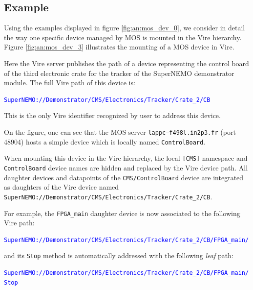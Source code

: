 \subsection{Example}

Using  the examples  displayed  in  figure \ref{fig:an:mos_dev_0},  we
consider  in detail  the way  one specific  device managed  by MOS  is
mounted   in  the   Vire   hierarchy.  Figure   \ref{fig:an:mos_dev_3}
illustrates the mounting of a MOS device in Vire.

Here the Vire  server publishes the path of a  device representing the
control board  of the third  electronic crate  for the tracker  of the
SuperNEMO demonstrator module.  The full Vire path of this device is:

\textcolor{blue}{\texttt{SuperNEMO://Demonstrator/CMS/Electronics/Tracker/Crate\_2/CB}}

This is  the only Vire identifier  recognized by user to  address this
device.

On    the   figure,    one    can   see    that    the   MOS    server
\texttt{lappc−f498l.in2p3.fr} (port 48904) hosts a simple device which
is locally named \texttt{ControlBoard}.

When  mounting   this  device  in   the  Vire  hierarchy,   the  local
\texttt{[CMS]}  namespace and  \texttt{ControlBoard} device  names are
hidden and replaced by the Vire device path.  All daughter devices and
datapoints of  the \texttt{CMS/ControlBoard} device are  integrated as
daughters        of        the         Vire        device        named\\
\texttt{SuperNEMO://Demonstrator/CMS/Electronics/Tracker/Crate\_2/CB}.


For example, the \texttt{FPGA\_main} daughter device is now associated
to the following Vire path:

\textcolor{blue}{\texttt{SuperNEMO://Demonstrator/CMS/Electronics/Tracker/Crate\_2/CB/FPGA\_main/}}

and  its  \texttt{Stop} method  is  automatically  addressed with  the
following \emph{leaf} path:

\textcolor{blue}{\texttt{SuperNEMO://Demonstrator/CMS/Electronics/Tracker/Crate\_2/CB/FPGA\_main/Stop}}


